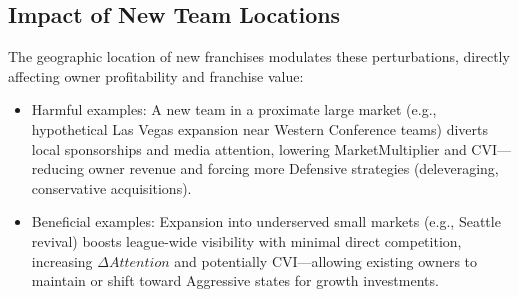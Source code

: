 \documentclass{mcmthesis}
\begin{document}
\subsection{Impact of New Team Locations}
The geographic location of new franchises modulates these perturbations, directly affecting owner profitability and franchise value:
\begin{itemize}
\item{Harmful examples}: A new team in a proximate large market (e.g., hypothetical Las Vegas expansion near Western Conference teams) diverts local sponsorships and media attention, lowering MarketMultiplier and CVI—reducing owner revenue and forcing more Defensive strategies (deleveraging, conservative acquisitions).
\item{Beneficial examples}: Expansion into underserved small markets (e.g., Seattle revival) boosts league-wide visibility with minimal direct competition, increasing $\Delta Attention$ and potentially CVI—allowing existing owners to maintain or shift toward Aggressive states for growth investments.
\end{itemize}

\end{document}

